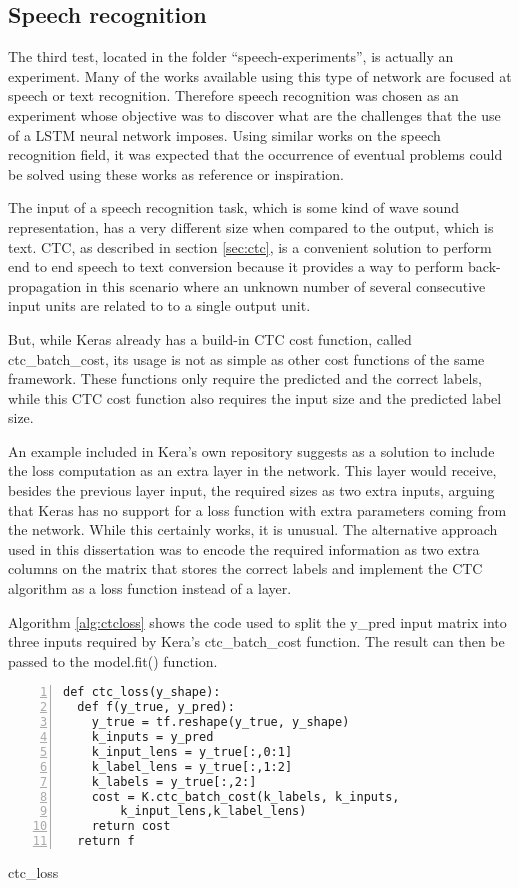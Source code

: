 \subsection{Speech recognition}
The third test, located in the folder ``speech-experiments'', is actually an experiment. Many of the works available using this type of network are focused at speech or text recognition. Therefore speech recognition was chosen as an experiment whose objective was to discover what are the challenges that the use of a LSTM neural network imposes. Using similar works on the speech recognition field, it was expected that the occurrence of eventual problems could be solved using these works as reference or inspiration.

The input of a speech recognition task, which is some kind of wave sound representation, has a very different size when compared to the output, which is text. CTC, as described in section \ref{sec:ctc},
is a convenient solution to perform end to end speech to text conversion because it provides a way to perform back-propagation in this scenario where an unknown number of several consecutive input units are related to to a single output unit.

But, while Keras already has a build-in CTC cost function, called ctc\_batch\_cost, its usage is not as simple as other cost functions of the same framework. These functions only require the predicted and the correct labels, while this CTC cost function also requires the input size and the predicted label size. 

An example included in Kera's own repository
suggests as a solution to include the loss computation as an extra layer in the network. This layer would receive, besides the previous layer input, the required sizes as two extra inputs, arguing that Keras has no support for a loss function with extra parameters coming from the network. 
While this certainly works, it is unusual. The alternative approach used in this dissertation was to encode the required information as two extra columns on the matrix that stores the correct labels and implement the CTC algorithm as a loss function instead of a layer.
 
Algorithm \ref{alg:ctcloss} shows the code used to split the y\_pred input matrix into three inputs required by Kera's ctc\_batch\_cost function. The result can then be passed to the model.fit() function.

\noindent
\begin{algorithm}
\begin{lstlisting}[frame=single, numbers=left]
def ctc_loss(y_shape):
  def f(y_true, y_pred):
    y_true = tf.reshape(y_true, y_shape)
    k_inputs = y_pred
    k_input_lens = y_true[:,0:1]
    k_label_lens = y_true[:,1:2]
    k_labels = y_true[:,2:]
    cost = K.ctc_batch_cost(k_labels, k_inputs,
        k_input_lens,k_label_lens)
    return cost
  return f
\end{lstlisting}
\caption{\label{alg:ctcloss}ctc\_loss}
\end{algorithm}

